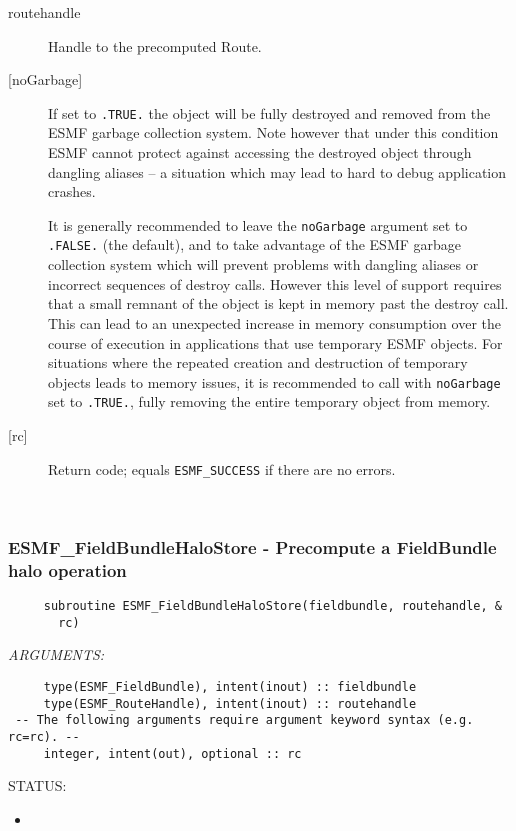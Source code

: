    \begin{description}
   \item [routehandle]
   Handle to the precomputed Route.
   \item[{[noGarbage]}]
   If set to {\tt .TRUE.} the object will be fully destroyed and removed
   from the ESMF garbage collection system. Note however that under this
   condition ESMF cannot protect against accessing the destroyed object
   through dangling aliases -- a situation which may lead to hard to debug
   application crashes.
  
   It is generally recommended to leave the {\tt noGarbage} argument
   set to {\tt .FALSE.} (the default), and to take advantage of the ESMF
   garbage collection system which will prevent problems with dangling
   aliases or incorrect sequences of destroy calls. However this level of
   support requires that a small remnant of the object is kept in memory
   past the destroy call. This can lead to an unexpected increase in memory
   consumption over the course of execution in applications that use
   temporary ESMF objects. For situations where the repeated creation and
   destruction of temporary objects leads to memory issues, it is
   recommended to call with {\tt noGarbage} set to {\tt .TRUE.}, fully
   removing the entire temporary object from memory.
   \item [{[rc]}]
   Return code; equals {\tt ESMF\_SUCCESS} if there are no errors.
   \end{description}
   
 
\mbox{}\hrulefill\ 
 
\subsubsection [ESMF\_FieldBundleHaloStore] {ESMF\_FieldBundleHaloStore - Precompute a FieldBundle halo operation}


  
\begin{verbatim}     subroutine ESMF_FieldBundleHaloStore(fieldbundle, routehandle, &
       rc)\end{verbatim}{\em ARGUMENTS:}
\begin{verbatim}     type(ESMF_FieldBundle), intent(inout) :: fieldbundle
     type(ESMF_RouteHandle), intent(inout) :: routehandle
 -- The following arguments require argument keyword syntax (e.g. rc=rc). --
     integer, intent(out), optional :: rc\end{verbatim}
{\sf STATUS:}
   \begin{itemize}
   \item{}
   \end{itemize}
  
